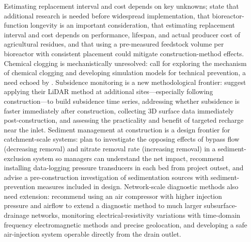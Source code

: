 \documentclass[11pt]{article}
\begin{document}
Estimating replacement interval and cost depends on key unknowns; \textcite{Kohn2023} state that additional research is needed before widespread implementation, that bioreactor-function longevity is an important consideration, that estimating replacement interval and cost depends on performance, lifespan, and actual producer cost of agricultural residues, and that using a pre-measured feedstock volume per bioreactor with consistent placement could mitigate construction-method effects. Chemical clogging is mechanistically unresolved: \textcite{Guo2020} call for exploring the mechanism of chemical clogging and developing simulation models for technical prevention, a need echoed by \textcite{Guo2021}. Subsidence monitoring is a new methodological frontier: \textcite{Christianson2025b} suggest applying their LiDAR method at additional sites---especially following construction---to build subsidence time series, addressing whether subsidence is faster immediately after construction, collecting 3D surface data immediately post-construction, and assessing the practicality and benefit of targeted recharge near the inlet. Sediment management at construction is a design frontier for catchment-scale systems: \textcite{Feyereisen2023} plan to investigate the opposing effects of bypass flow (decreasing removal) and nitrate removal rate (increasing removal) in a sediment-exclusion system so managers can understand the net impact, recommend installing data-logging pressure transducers in each bed from project outset, and advise a pre-construction investigation of sedimentation sources with sediment-prevention measures included in design. Network-scale diagnostic methods also need extension: \textcite{Henine2021} recommend using an air compressor with higher injection pressure and airflow to extend a diagnostic method to much larger subsurface-drainage networks, monitoring electrical-resistivity variations with time-domain frequency electromagnetic methods and precise geolocation, and developing a safe air-injection system operable directly from the drain outlet.
\end{document}
